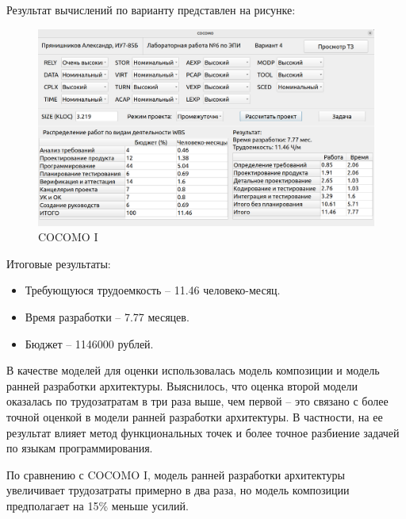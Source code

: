 Результат вычислений по варианту представлен на рисунке:
\FloatBarrier
\begin{figure}[h]	
	\begin{center}
		\includegraphics[width=\linewidth]{inc/first.png}
	\end{center}
	\captionsetup{justification=centering}
	\caption{COCOMO I}
\end{figure}
\FloatBarrier 

Итоговые результаты:
\begin{itemize}
	\item Требующуюся трудоемкость -- 11.46 человеко-месяц.
	\item Время разработки -- 7.77 месяцев.
	\item Бюджет -- 1146000 рублей.
\end{itemize}

В качестве моделей для оценки использовалась модель композиции и модель ранней разработки архитектуры.
Выяснилось, что оценка второй модели оказалась по трудозатратам в три раза выше, чем первой -- это связано с более точной оценкой в модели ранней разработки архитектуры. 
В частности, на ее результат влияет метод функциональных точек и более точное разбиение задачей по языкам программирования.

По сравнению с COCOMO I, модель ранней разработки архитектуры увеличивает трудозатраты примерно в два раза, но модель композиции предполагает на 15\% меньше усилий.